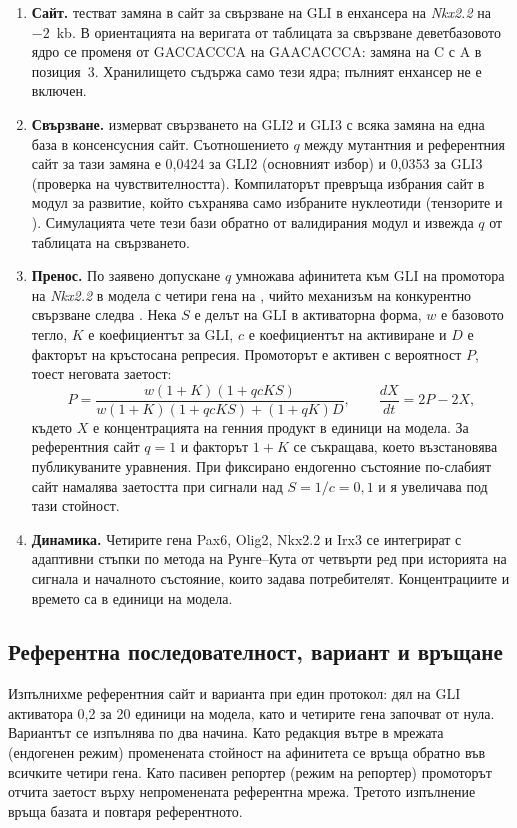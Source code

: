 \documentclass[10.5pt,a4paper]{article}
\begin{document}
\begin{enumerate}
\item \textbf{Сайт.} \citet{peterson2012} тестват замяна в сайт за свързване на GLI в енхансера на \emph{Nkx2.2} на $-2$~kb. В ориентацията на веригата от таблицата за свързване деветбазовото ядро се променя от GACCACCCA на GAACACCCA: замяна на C с A в позиция~3. Хранилището съдържа само тези ядра; пълният енхансер не е включен.
\item \textbf{Свързване.} \citet{hallikas2006} измерват свързването на GLI2 и GLI3 с всяка замяна на една база в консенсусния сайт. Съотношението $q$ между мутантния и референтния сайт за тази замяна е 0,0424 за GLI2 (основният избор) и 0,0353 за GLI3 (проверка на чувствителността). Компилаторът превръща избрания сайт в модул за развитие, който съхранява само избраните нуклеотиди (тензорите  и ). Симулацията чете тези бази обратно от валидирания модул и извежда $q$ от таблицата на свързването.
\item \textbf{Пренос.} По заявено допускане $q$ умножава афинитета към GLI на промотора на \emph{Nkx2.2} в модела с четири гена на \citet{herreradelgado2020}, чийто механизъм на конкурентно свързване следва \citet{cohen2014}. Нека $S$ е делът на GLI в активаторна форма, $w$ е базовото тегло, $K$ е коефициентът за GLI, $c$ е коефициентът на активиране и $D$ е факторът на кръстосана репресия. Промоторът е активен с вероятност $P$, тоест неговата заетост:
\[
P=\frac{w(1+K)(1+qcKS)}{w(1+K)(1+qcKS)+(1+qK)D},\qquad \frac{dX}{dt}=2P-2X,
\]
където $X$ е концентрацията на генния продукт в единици на модела. За референтния сайт $q=1$ и факторът $1+K$ се съкращава, което възстановява публикуваните уравнения. При фиксирано ендогенно състояние по-слабият сайт намалява заетостта при сигнали над \mbox{$S=1/c=0{,}1$} и я увеличава под тази стойност.
\item \textbf{Динамика.} Четирите гена Pax6, Olig2, Nkx2.2 и Irx3 се интегрират с адаптивни стъпки по метода на Рунге–Кута от четвърти ред при историята на сигнала и началното състояние, които задава потребителят. Концентрациите и времето са в единици на модела.
\end{enumerate}

\subsection{Референтна последователност, вариант и връщане}

Изпълнихме референтния сайт и варианта при един протокол: дял на GLI активатора 0,2 за 20 единици на модела, като и четирите гена започват от нула. Вариантът се изпълнява по два начина. Като редакция вътре в мрежата (ендогенен режим) променената стойност на афинитета се връща обратно във всичките четири гена. Като пасивен репортер (режим на репортер) промоторът отчита заетост върху непроменената референтна мрежа. Третото изпълнение връща базата и повтаря референтното.
\end{document}

